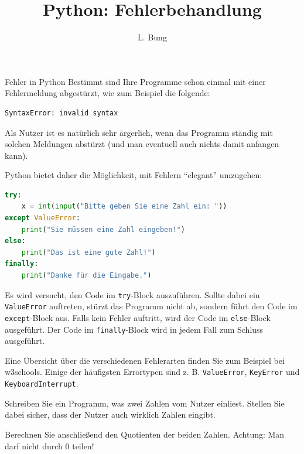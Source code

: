 \documentclass[11pt, a4paper, oneside]{article}
\begin{document}
	\author{L. Bung}
	\title{Python: Fehlerbehandlung}
	\subject{Informatik}
	\maketitle
	
	\begin{hint}{Fehler in Python}
		Bestimmt sind Ihre Programme schon einmal mit einer Fehlermeldung abgestürzt, wie zum Beispiel die folgende:
		
		\begin{lstlisting}[numbers=none]
SyntaxError: invalid syntax
		\end{lstlisting}
		
		Als Nutzer ist es natürlich sehr ärgerlich, wenn das Programm ständig mit solchen Meldungen abstürzt (und man eventuell auch nichts damit anfangen kann).
		
		Python bietet daher die Möglichkeit, mit Fehlern ``elegant'' umzugehen:
		
		\begin{lstlisting}[numbers=none, language=python]
try:
	x = int(input("Bitte geben Sie eine Zahl ein: "))
except ValueError:
	print("Sie müssen eine Zahl eingeben!")
else:
	print("Das ist eine gute Zahl!")
finally:
	print("Danke für die Eingabe.")
		\end{lstlisting}
		
		Es wird versucht, den Code im \texttt{try}-Block auszuführen.
		Sollte dabei ein \texttt{ValueError} auftreten, stürzt das Programm nicht ab, sondern führt den Code im \texttt{except}-Block aus.
		Falls kein Fehler auftritt, wird der Code im \texttt{else}-Block ausgeführt.
		Der Code im \texttt{finally}-Block wird in jedem Fall zum Schluss ausgeführt.
		
		Eine Übersicht über die verschiedenen Fehlerarten finden Sie zum Beispiel bei w3schools\footnotemark.
		Einige der häufigsten Errortypen sind z. B. \texttt{ValueError}, \texttt{KeyError} und \texttt{KeyboardInterrupt}.
	\end{hint}
	
	
	Schreiben Sie ein Programm, was zwei Zahlen vom Nutzer einliest.
	Stellen Sie dabei sicher, dass der Nutzer auch wirklich Zahlen eingibt.
	
	Berechnen Sie anschließend den Quotienten der beiden Zahlen.
	Achtung: Man darf nicht durch 0 teilen!
	
\end{document}
